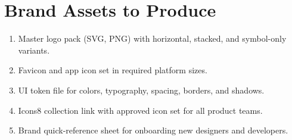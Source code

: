 \documentclass[11pt,a4paper]{article}
\begin{document}
\section{Brand Assets to Produce}

\begin{enumerate}[leftmargin=*]
    \item Master logo pack (SVG, PNG) with horizontal, stacked, and symbol-only variants.
    \item Favicon and app icon set in required platform sizes.
    \item UI token file for colors, typography, spacing, borders, and shadows.
    \item Icons8 collection link with approved icon set for all product teams.
    \item Brand quick-reference sheet for onboarding new designers and developers.
\end{enumerate}
\end{document}
